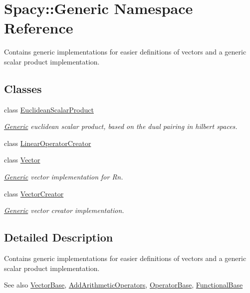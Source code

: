 \hypertarget{namespaceSpacy_1_1Generic}{}\section{Spacy\+:\+:Generic Namespace Reference}
\label{namespaceSpacy_1_1Generic}


Contains generic implementations for easier definitions of vectors and a generic scalar product implementation.  


\subsection*{Classes}
\begin{DoxyCompactItemize}
\item 
class \hyperlink{classSpacy_1_1Generic_1_1EuclideanScalarProduct}{Euclidean\+Scalar\+Product}
\begin{DoxyCompactList}\small\item\em \hyperlink{namespaceSpacy_1_1Generic}{Generic} euclidean scalar product, based on the dual pairing in hilbert spaces. \end{DoxyCompactList}\item 
class \hyperlink{classSpacy_1_1Generic_1_1LinearOperatorCreator}{Linear\+Operator\+Creator}
\item 
class \hyperlink{classSpacy_1_1Generic_1_1Vector}{Vector}
\begin{DoxyCompactList}\small\item\em \hyperlink{namespaceSpacy_1_1Generic}{Generic} vector implementation for Rn. \end{DoxyCompactList}\item 
class \hyperlink{classSpacy_1_1Generic_1_1VectorCreator}{Vector\+Creator}
\begin{DoxyCompactList}\small\item\em \hyperlink{namespaceSpacy_1_1Generic}{Generic} vector creator implementation. \end{DoxyCompactList}\end{DoxyCompactItemize}


\subsection{Detailed Description}
Contains generic implementations for easier definitions of vectors and a generic scalar product implementation. 

\begin{DoxySeeAlso}{See also}
\hyperlink{classSpacy_1_1VectorBase}{Vector\+Base}, \hyperlink{classSpacy_1_1AddArithmeticOperators}{Add\+Arithmetic\+Operators}, \hyperlink{classSpacy_1_1OperatorBase}{Operator\+Base}, \hyperlink{classSpacy_1_1FunctionalBase}{Functional\+Base} 
\end{DoxySeeAlso}
